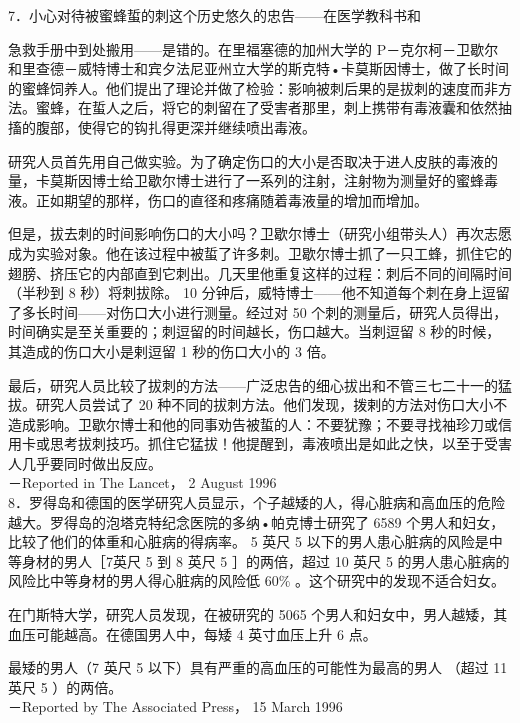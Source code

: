 7．小心对待被蜜蜂蜇的刺这个历史悠久的忠告——在医学教科书和

急救手册中到处搬用——是错的。在里福塞德的加州大学的 P－克尔柯－卫歇尔和里查德－威特博士和宾夕法尼亚州立大学的斯克特•卡莫斯因博士，做了长时间的蜜蜂饲养人。他们提出了理论并做了检验：影响被刺后果的是拔刺的速度而非方法。蜜蜂，在蜇人之后，将它的刺留在了受害者那里，刺上携带有毒液囊和依然抽搐的腹部，使得它的钩扎得更深并继续喷出毒液。

研究人员首先用自己做实验。为了确定伤口的大小是否取决于进人皮肤的毒液的量，卡莫斯因博士给卫歇尔博士进行了一系列的注射，注射物为测量好的蜜蜂毒液。正如期望的那样，伤口的直径和疼痛随着毒液量的增加而增加。

但是，拔去刺的时间影响伤口的大小吗？卫歇尔博士（研究小组带头人）再次志愿成为实验对象。他在该过程中被蜇了许多刺。卫歇尔博士抓了一只工蜂，抓住它的翅膀、挤压它的内部直到它刺出。几天里他重复这样的过程：刺后不同的间隔时间（半秒到 8 秒）将刺拔除。 10 分钟后，威特博士——他不知道每个刺在身上逗留了多长时间——对伤口大小进行测量。经过对 50 个刺的测量后，研究人员得出，时间确实是至关重要的；刺逗留的时间越长，伤口越大。当刺逗留 8 秒的时候，其造成的伤口大小是剌逗留 1 秒的伤口大小的 3 倍。

最后，研究人员比较了拔刺的方法——广泛忠告的细心拔出和不管三七二十一的猛拔。研究人员尝试了 20 种不同的拔刺方法。他们发现，拨剌的方法对伤口大小不造成影响。卫歇尔博士和他的同事劝告被蜇的人：不要犹豫；不要寻找袖珍刀或信用卡或思考拔刺技巧。抓住它猛拔！他提醒到，毒液喷出是如此之快，以至于受害人几乎要同时做出反应。\\
－Reported in The Lancet， 2 August 1996\\
8．罗得岛和德国的医学研究人员显示，个子越矮的人，得心脏病和高血压的危险越大。罗得岛的泡塔克特纪念医院的多纳•帕克博士研究了 6589 个男人和妇女，比较了他们的体重和心脏病的得病率。 5 英尺 5 以下的男人患心脏病的风险是中等身材的男人［7英尺 5 到 8 英尺 5 ］的两倍，超过 10 英尺 5 的男人患心脏病的风险比中等身材的男人得心脏病的风险低 $60 \%$ 。这个研究中的发现不适合妇女。

在门斯特大学，研究人员发现，在被研究的 5065 个男人和妇女中，男人越矮，其血压可能越高。在德国男人中，每矮 4 英寸血压上升 6 点。

最矮的男人（7 英尺 5 以下）具有严重的高血压的可能性为最高的男人 （超过 11 英尺 5 ）的两倍。\\
－Reported by The Associated Press， 15 March 1996

